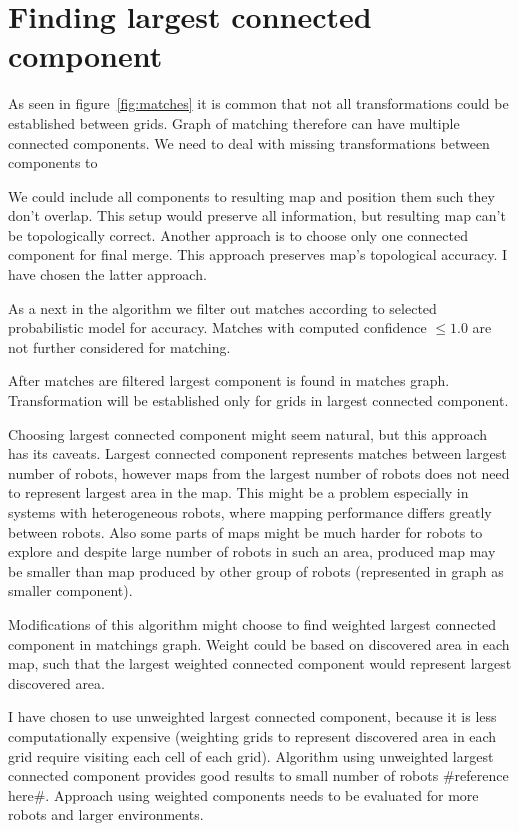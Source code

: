 
\section{Finding largest connected component} %
\label{sec:finding_largest_connected_component}

As seen in figure~\ref{fig:matches} it is common that not all transformations could be established between grids. Graph of matching therefore can have multiple connected components. We need to deal with missing transformations between components to

We could include all components to resulting map and position them such they don't overlap. This setup would preserve all information, but resulting map can't be topologically correct. Another approach is to choose only one connected component for final merge. This approach preserves map's topological accuracy. I have chosen the latter approach.

As a next in the algorithm we filter out matches according to selected probabilistic model for accuracy. Matches with computed confidence $\le 1.0$ are not further considered for matching.

After matches are filtered largest component is found in matches graph. Transformation will be established only for grids in largest connected component.

Choosing largest connected component might seem natural, but this approach has its caveats. Largest connected component represents matches between largest number of robots, however maps from the largest number of robots does not need to represent largest area in the map. This might be a problem especially in systems with heterogeneous robots, where mapping performance differs greatly between robots. Also some parts of maps might be much harder for robots to explore and despite large number of robots in such an area, produced map may be smaller than map produced by other group of robots (represented in graph as smaller component).

Modifications of this algorithm might choose to find weighted largest connected component in matchings graph. Weight could be based on discovered area in each map, such that the largest weighted connected component would represent largest discovered area.

I have chosen to use unweighted largest connected component, because it is less computationally expensive (weighting grids to represent discovered area in each grid require visiting each cell of each grid). Algorithm using unweighted largest connected component provides good results to small number of robots \#reference here\#. Approach using weighted components needs to be evaluated for more robots and larger environments.


